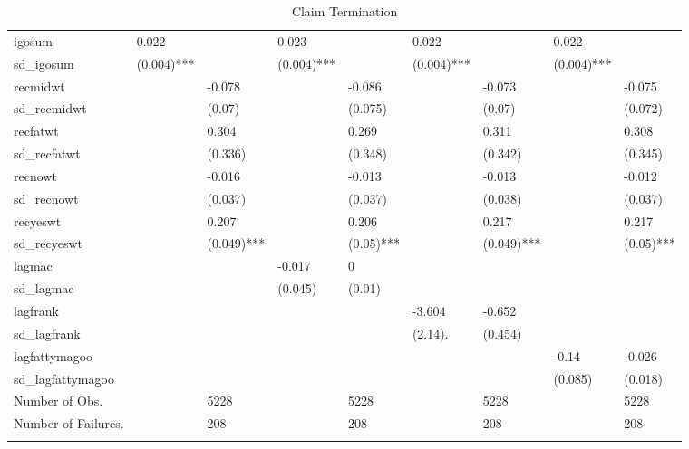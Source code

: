 \begin{table}[ht]
\begin{tabular}{lllllllll}
  igosum & 0.022 &  & 0.023 &  & 0.022 &  & 0.022 &  \\ 
  sd\_igosum & (0.004)*** &  & (0.004)*** &  & (0.004)*** &  & (0.004)*** &  \\ 
  recmidwt &  & -0.078 &  & -0.086 &  & -0.073 &  & -0.075 \\ 
  sd\_recmidwt &  & (0.07)  &  & (0.075)  &  & (0.07)  &  & (0.072)  \\ 
  recfatwt &  & 0.304 &  & 0.269 &  & 0.311 &  & 0.308 \\ 
  sd\_recfatwt &  & (0.336)  &  & (0.348)  &  & (0.342)  &  & (0.345)  \\ 
  recnowt &  & -0.016 &  & -0.013 &  & -0.013 &  & -0.012 \\ 
  sd\_recnowt &  & (0.037)  &  & (0.037)  &  & (0.038)  &  & (0.037)  \\ 
  recyeswt &  & 0.207 &  & 0.206 &  & 0.217 &  & 0.217 \\ 
  sd\_recyeswt &  & (0.049)*** &  & (0.05)*** &  & (0.049)*** &  & (0.05)*** \\ 
  lagmac &  &  & -0.017 & 0 &  &  &  &  \\ 
  sd\_lagmac &  &  & (0.045)  & (0.01)  &  &  &  &  \\ 
  lagfrank &  &  &  &  & -3.604 & -0.652 &  &  \\ 
  sd\_lagfrank &  &  &  &  & (2.14). & (0.454)  &  &  \\ 
  lagfattymagoo &  &  &  &  &  &  & -0.14 & -0.026 \\ 
  sd\_lagfattymagoo &  &  &  &  &  &  & (0.085)  & (0.018)  \\ 
  Number of Obs. &  & 5228 &  & 5228 &  & 5228 &  & 5228 \\ 
  Number of Failures. &  & 208 &  & 208 &  & 208 &  & 208 \\ 
   \hline \footnotesize{  }
\end{tabular}
\caption{Claim Termination} 
\end{table}
